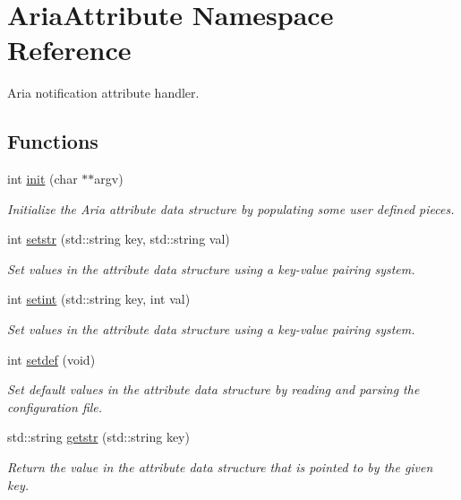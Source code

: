 \hypertarget{namespaceAriaAttribute}{}\section{Aria\+Attribute Namespace Reference}
\label{namespaceAriaAttribute}


Aria notification attribute handler.  


\subsection*{Functions}
\begin{DoxyCompactItemize}
\item 
int \hyperlink{namespaceAriaAttribute_a3a5236d92709e7f388d3b9a1518600c8}{init} (char $\ast$$\ast$argv)
\begin{DoxyCompactList}\small\item\em Initialize the Aria attribute data structure by populating some user defined pieces. \end{DoxyCompactList}\item 
int \hyperlink{namespaceAriaAttribute_af61c3761904e3565cf2aebe81b6c47e7}{setstr} (std\+::string key, std\+::string val)
\begin{DoxyCompactList}\small\item\em Set values in the attribute data structure using a key-\/value pairing system. \end{DoxyCompactList}\item 
int \hyperlink{namespaceAriaAttribute_a2bd079b87e4ecbce0caa2935c3bfad1a}{setint} (std\+::string key, int val)
\begin{DoxyCompactList}\small\item\em Set values in the attribute data structure using a key-\/value pairing system. \end{DoxyCompactList}\item 
int \hyperlink{namespaceAriaAttribute_a6e836e2e4bf4fe7932ed03c177803ac3}{setdef} (void)
\begin{DoxyCompactList}\small\item\em Set default values in the attribute data structure by reading and parsing the configuration file. \end{DoxyCompactList}\item 
std\+::string \hyperlink{namespaceAriaAttribute_a0520d9c63a5d56d843824d19ba47468b}{getstr} (std\+::string key)
\begin{DoxyCompactList}\small\item\em Return the value in the attribute data structure that is pointed to by the given key. \end{DoxyCompactList}\item 
$$
\end{DoxyCompactItemize}
